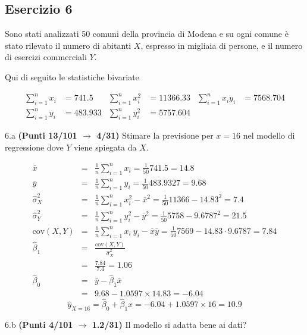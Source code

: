 \documentclass[
  11pt,
]{book}
\theoremstyle{mytheoremstyle}
\theoremstyle{mydefstyle}
\newenvironment{sol}
  {
  \begin{tcolorbox}[enhanced,breakable,arc=0.1mm,boxrule=1pt,colback=white,colframe=iblue,
  title=\bf \fontfamily{lmss}\selectfont \hspace{.5 cm} Soluzione,drop fuzzy shadow]

}{
\end{tcolorbox}
  }
\begin{document}
\subsection{Esercizio 6}\label{esercizio-6-12}

Sono stati analizzati 50 comuni della provincia di Modena e su ogni comune è stato rilevato
il numero di abitanti \(X\), espresso in migliaia di persone, e il numero di esercizi commerciali \(Y\).

Qui di seguito le statistiche bivariate

\begin{align*}
  \sum_{i=1}^n x_i &= 741.5 &\sum_{i=1}^n x_i^2 &= 11366.33 &\sum_{i=1}^n x_i y_i &= 7568.704\\
  \sum_{i=1}^n y_i &= 483.933 & \sum_{i=1}^n y_i^2 &= 5757.604 &
\end{align*}

6.a \textbf{(Punti 13/101 \(\rightarrow\) 4/31)} Stimare la previsione per \(x=16\) nel modello di regressione dove \(Y\) viene spiegata da \(X\).

\begin{sol}
\begin{eqnarray*}
           \bar x &=&\frac 1 n\sum_{i=1}^n x_i = \frac {1}{ 50 }  741.5 =  14.8 \\
           \bar y &=&\frac 1 n\sum_{i=1}^n y_i = \frac {1}{ 50 }  483.9327 =  9.68 \\
           \hat\sigma_X^2&=&\frac 1 n\sum_{i=1}^n x_i^2-\bar x^2=\frac {1}{ 50 }  11366  - 14.83 ^2= 7.4 \\
           \hat\sigma_Y^2&=&\frac 1 n\sum_{i=1}^n y_i^2-\bar y^2=\frac {1}{ 50 }  5758  - 9.6787 ^2= 21.5 \\
           \text{cov}(X,Y)&=&\frac 1 n\sum_{i=1}^n x_i~y_i-\bar x\bar y=\frac {1}{ 50 }  7569 - 14.83 \cdot 9.6787 = 7.84 \\
           \hat\beta_1 &=& \frac{\text{cov}(X,Y)}{\hat\sigma_X^2} \\
                    &=& \frac{ 7.84 }{ 7.4 }  =  1.06 \\
           \hat\beta_0 &=& \bar y - \hat\beta_1 \bar x\\
                    &=&  9.68 - 1.0597 \times  14.83 = -6.04 
         \end{eqnarray*}\[\hat y_{X= 16 }=\hat\beta_0+\hat\beta_1 x= -6.04 + 1.0597 \times 16 = 10.9 \]

\end{sol}

6.b \textbf{(Punti 4/101 \(\rightarrow\) 1.2/31)} Il modello si adatta bene ai dati?
\end{document}
